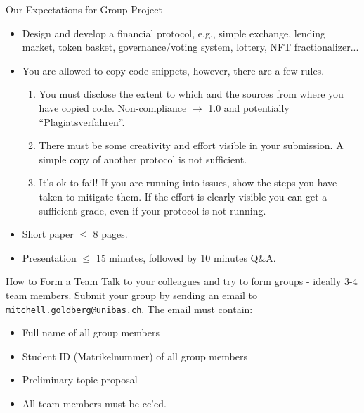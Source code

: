 \documentclass[handout]{beamer}
\begin{document}
\begin{frame}{Our Expectations for Group Project}
	\begin{itemize}
		\item<1-> \color{focus}Design and develop a financial protocol\color{black}, e.g., simple exchange, lending market, token basket, governance/voting system, lottery, NFT fractionalizer...
		\item<2-> You are \color{focus} allowed to copy code \color{black} snippets, however, there are a few rules.
		\begin{enumerate}
			\item<3-> \color{focus} You must disclose \color{black} the \color{focus} extent \color{black} to which and the \color{focus} sources \color{black} from where you have copied code. Non-compliance $\rightarrow$ 1.0 and potentially ``Plagiatsverfahren''. \vspace{0.35em}
			\item<4-> There must be some \color{focus} creativity and effort \color{black} visible in your submission. A simple copy of another protocol is not sufficient.\vspace{0.35em}
			\item<5-> \color{focus} It's ok to fail! \color{black} If you are running into issues, show the steps you have taken to mitigate them. If the effort is clearly visible you can get a sufficient grade, even if your protocol is not running.
		\end{enumerate}
		\item<6-> Short paper $\leq$ 8 pages. 
		\item<7-> Presentation $\leq$ 15 minutes, followed by 10 minutes Q\&A.
	\end{itemize}
\end{frame}

\begin{frame}{How to Form a Team}
\label{TEAM}
	Talk to your colleagues and try to form groups - ideally 3-4 team members. Submit your group by sending an email to \href{mailto:mitchell.goldberg@unibas.ch?subject=Group\%20SCDF}{\texttt{mitchell.goldberg@unibas.ch}}. The email must contain:
	\begin{itemize}
		\item<2-> Full name of all group members
		\item<3-> Student ID (Matrikelnummer) of all group members
		\item<4-> Preliminary topic proposal
		\item<5-> All team members must be cc'ed.
	\end{itemize}

\vspace{1.5em}
\end{frame}
\end{document}
